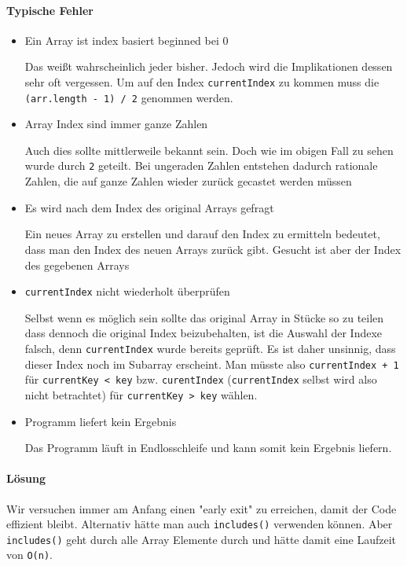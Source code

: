\documentclass[babel]{book}
\begin{document}
\paragraph{Typische Fehler}
\begin{itemize} 
	\item Ein Array ist index basiert beginned bei 0
	
	Das weißt wahrscheinlich jeder bisher. Jedoch wird die Implikationen dessen sehr oft vergessen. Um auf den Index \lstinline|currentIndex| zu kommen muss die \lstinline|(arr.length - 1) / 2| genommen werden.
	\item Array Index sind immer ganze Zahlen
	
	Auch dies sollte mittlerweile bekannt sein. Doch wie im obigen Fall zu sehen wurde durch \lstinline|2| geteilt. Bei ungeraden Zahlen entstehen dadurch rationale Zahlen, die auf ganze Zahlen wieder zurück gecastet werden müssen
	
	\item Es wird nach dem Index des original Arrays gefragt
	
	Ein neues Array zu erstellen und darauf den Index zu ermitteln bedeutet, dass man den Index des neuen Arrays zurück gibt. Gesucht ist aber der Index des gegebenen Arrays
	\item \lstinline|currentIndex| nicht wiederholt überprüfen
	
	Selbst wenn es möglich sein sollte das original Array in Stücke so zu teilen dass dennoch die original Index beizubehalten, ist die Auswahl der Indexe falsch, denn \lstinline|currentIndex| wurde bereits geprüft. Es ist daher unsinnig, dass dieser Index noch im Subarray erscheint. Man müsste also \lstinline|currentIndex + 1| für \lstinline|currentKey < key| bzw. \lstinline|curentIndex| (\lstinline|currentIndex| selbst wird also nicht betrachtet) für \lstinline|currentKey > key| wählen.
	
	\item Programm liefert kein Ergebnis
	
	Das Programm läuft in Endlosschleife und kann somit kein Ergebnis liefern.
	
\end{itemize}
\paragraph{Lösung}
Wir versuchen immer am Anfang einen "early exit" zu erreichen, damit der Code effizient bleibt. Alternativ hätte man auch \lstinline|includes()| verwenden können. Aber \lstinline|includes()| geht durch alle Array Elemente durch und hätte damit eine Laufzeit von \lstinline|O(n)|. 
\end{document}
